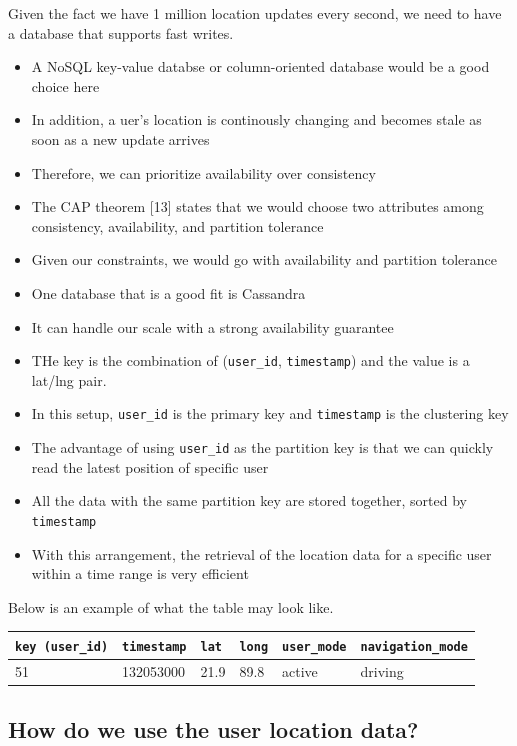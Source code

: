 \documentclass{report}
\theoremstyle{definition}
\let\oldsubsection\subsection
\renewcommand{\subsection}{\oldsubsection*}
\begin{document}
Given the fact we have 1 million location updates every second, we need to have a database that supports fast writes.

\begin{itemize}
\item
A NoSQL key-value databse or column-oriented database would be a good choice here
\item
In addition, a uer's location is continously changing and becomes stale as soon as a new update arrives
\item
Therefore, we can prioritize availability over consistency
\item
The CAP theorem [13] states that we would choose two attributes among consistency, availability, and partition tolerance
\item
Given our constraints, we would go with availability and partition tolerance
\item
One database that is a good fit is Cassandra
\item
It can handle our scale with a strong availability guarantee
\item
THe key is the combination of (\lstinline|user_id|, \lstinline|timestamp|) and the value is a lat/lng pair.
\item
In this setup, \lstinline|user_id| is the primary key and \lstinline{timestamp} is the clustering key
\item
The advantage of using \lstinline|user_id| as the partition key is that we can quickly read the latest position of specific user
\item
All the data with the same partition key are stored together, sorted by \lstinline|timestamp|
\item
With this arrangement, the retrieval of the location data for a specific user within a time range is very efficient
\end{itemize}

Below is an example of what the table may look like.

\begin{tabular}{|p{2.2cm}|p{2.2cm}|p{2.2cm}|p{2.2cm}|p{2.2cm}|p{2.4cm}|}
\hline
\lstinline|key (user_id)| & \lstinline|timestamp| & \lstinline|lat| & \lstinline|long| & \lstinline|user_mode| & \lstinline|navigation_mode| \\
\hline
51 & 132053000 & 21.9 & 89.8 & active & driving \\
\hline
\end{tabular}

\subsection{How do we use the user location data?}
\end{document}
